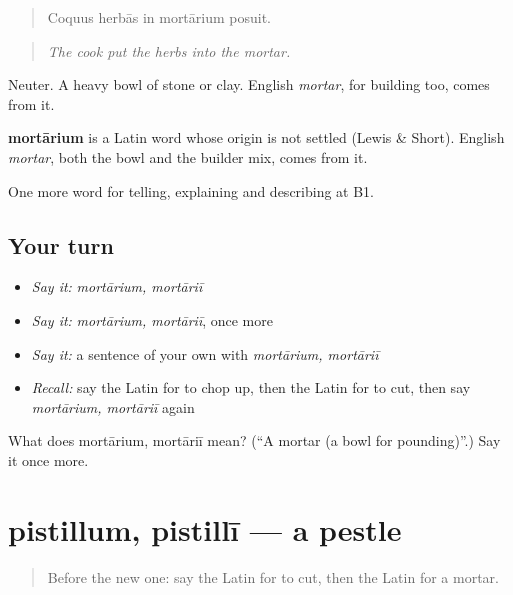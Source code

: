 \begin{quote}
Coquus herbās in mortārium posuit.
\end{quote}

\begin{quote}
\emph{The cook put the herbs into the mortar.}
\end{quote}

Neuter. A heavy bowl of stone or clay. English \emph{mortar}, for building too, comes from it.

\begin{cousinweb}
\textbf{mortārium} is a Latin word whose origin is not settled (Lewis \& Short). English \emph{mortar}, both the bowl and the builder mix, comes from it.
\end{cousinweb}

\begin{grammarlens}[title={What you've built}]
One more word for telling, explaining and describing at B1.
\end{grammarlens}

\subsection*{Your turn}
\begin{itemize}
\raggedright
  \item \emph{Say it:} \emph{mortārium, mortāriī}
  \item \emph{Say it:} \emph{mortārium, mortāriī}, once more
  \item \emph{Say it:} a sentence of your own with \emph{mortārium, mortāriī}
  \item \emph{Recall:} say the Latin for to chop up, then the Latin for to cut, then say \emph{mortārium, mortāriī} again
\end{itemize}

\begin{tcolorbox}[breakable,colback=teal!4,colframe=teal!35!black,title={Before you move on}]
What does mortārium, mortāriī mean? (\textquotedblleft{}A mortar (a bowl for pounding)\textquotedblright{}.) Say it once more.
\end{tcolorbox}
\section[pistillum, pistillī]{pistillum, pistillī — a pestle}

\label{lesson:LA-C351-pistillum}



\begin{quote}
Before the new one: say the Latin for to cut, then the Latin for a mortar.
\end{quote}


